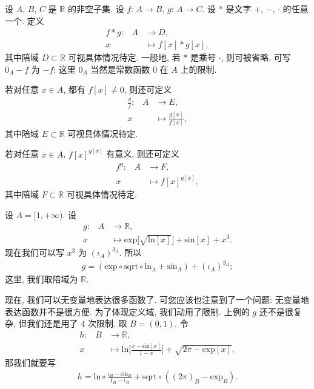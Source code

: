 \begin{definition}
    设 $A$, $B$, $C$ 是 $\mathbb{R}$ 的非空子集. 设 $f$: $A \to B$, $g$: $A \to C$. 设 $\ast$ 是文字 $+$, $-$, $\cdot$ 的任意一个. 定义
    \begin{align*}
        \text{$f \ast g$:} \quad
        A & \to D,                  \\
        x & \mapsto f[x] \ast g[x],
    \end{align*}
    其中陪域 $D \subset \mathbb{R}$ 可视具体情况待定. 一般地, 若 $\ast$ 是乘号 $\cdot$, 则可被省略. 可写 $0_A - f$ 为 $-f$; 这里 $0_A$ 当然是常数函数 $0$ 在 $A$ 上的限制.

    若对任意 $x \in A$, 都有 $f[x] \neq 0$, 则还可定义
    \begin{align*}
        \text{$\frac{g}{f}$:} \quad
        A & \to E,                     \\
        x & \mapsto \frac{g[x]}{f[x]},
    \end{align*}
    其中陪域 $E \subset \mathbb{R}$ 可视具体情况待定.

    若对任意 $x \in A$, ${f[x]}^{g[x]}$ 有意义, 则还可定义
    \begin{align*}
        \text{${f}^{g}$:} \quad
        A & \to F,                 \\
        x & \mapsto {f[x]}^{g[x]},
    \end{align*}
    其中陪域 $F \subset \mathbb{R}$ 可视具体情况待定.
\end{definition}

\begin{example}
    设 $A = [1, +\infty)$. 设
    \begin{align*}
        \text{$g$:} \quad
        A & \to \mathbb{R},                                                                           \\
        x & \mapsto \mathrm{exp} {\bigg[ \sqrt{\mathrm{ln} {[x]}} \bigg]} + \mathrm{sin} {[x]} + x^3.
    \end{align*}
    现在我们可以写 $x^3$ 为 ${(\iota_A)}^{3_A}$. 所以
    \begin{align*}
        g = (\mathrm{exp} \circ \mathrm{sqrt} \circ \mathrm{ln}_{A} + \mathrm{sin}_{A}) + {(\iota_A)}^{3_A};
    \end{align*}
    这里, 我们取陪域为 $\mathbb{R}$.
\end{example}

现在, 我们可以无变量地表达很多函数了. 可您应该也注意到了一个问题: 无变量地表达函数并不是很方便. 为了体现定义域, 我们动用了限制. 上例的 $g$ 还不是很复杂, 但我们还是用了 $4$ 次限制. 取 $B = (0, 1)$. 令
\begin{align*}
    \text{$h$:} \quad
    B & \to \mathbb{R},                                                                                              \\
    x & \mapsto \mathrm{ln} {\bigg[ \frac{x - \mathrm{sin} {[x]}}{1 - x} \bigg]} + \sqrt{2\pi - \mathrm{exp} {[x]}},
\end{align*}
那我们就要写
\begin{align*}
    h = \mathrm{ln} \circ \frac{\iota_B - \mathrm{sin}_B}{1_B - \iota_B} + \mathrm{sqrt} \circ ((2\pi)_B - \mathrm{exp}_B).
\end{align*}

